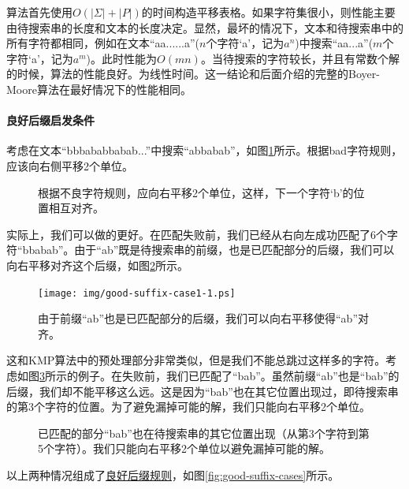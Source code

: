 \documentclass[UTF8]{article}
\begin{document}
算法首先使用$O(|\Sigma| + |P|)$的时间构造平移表格。如果字符集很小，则性能主要由待搜索串的长度和文本的长度决定。显然，最坏的情况下，文本和待搜索串中的所有字符都相同，例如在文本“aa......a”($n$个字符‘a’，记为$a^n$)中搜索“aa...a”($m$个字符‘a’，记为$a^m$)。此时性能为$O(mn)$。当待搜索的字符较长，并且有常数个解的时候，算法的性能良好。为线性时间。这一结论和后面介绍的完整的Boyer-Moore算法在最好情况下的性能相同。

\paragraph{良好后缀启发条件}

考虑在文本“bbbababbabab...”中搜索“abbabab”，如图\ref{fig:bad-char-2}所示。根据bad字符规则，应该向右侧平移2个单位。

\begin{figure}[htbp]
 \centering
 \caption{根据不良字符规则，应向右平移2个单位，这样，下一个字符‘b’的位置相互对齐。}
 \label{fig:bad-char-2}
\end{figure}

实际上，我们可以做的更好。在匹配失败前，我们已经从右向左成功匹配了6个字符“bbabab”。由于“ab”既是待搜索串的前缀，也是已匹配部分的后缀，我们可以向右平移对齐这个后缀，如图\ref{fig:good-suffix-case1-1}所示。

\begin{figure}[htbp]
 \centering
 \texttt{[image: img/good-suffix-case1-1.ps]}
 \caption{由于前缀“ab”也是已匹配部分的后缀，我们可以向右平移使得“ab”对齐。}
 \label{fig:good-suffix-case1-1}
\end{figure}

这和KMP算法中的预处理部分非常类似，但是我们不能总跳过这样多的字符。考虑如图\ref{fig:good-suffix-case2-1}所示的例子。在失败前，我们已匹配了“bab”。虽然前缀“ab”也是“bab”的后缀，我们却不能平移这么远。这是因为“bab”也在其它位置出现过，即待搜索串的第3个字符的位置。为了避免漏掉可能的解，我们只能向右平移2个单位。

\begin{figure}[htbp]
 \centering
 \caption{已匹配的部分“bab”也在待搜索串的其它位置出现（从第3个字符到第5个字符）。我们只能向右平移2个单位以避免漏掉可能的解。}
 \label{fig:good-suffix-case2-1}
\end{figure}

以上两种情况组成了\underline{良好后缀规则}，如图\ref{fig:good-suffix-cases}所示。
\end{document}
